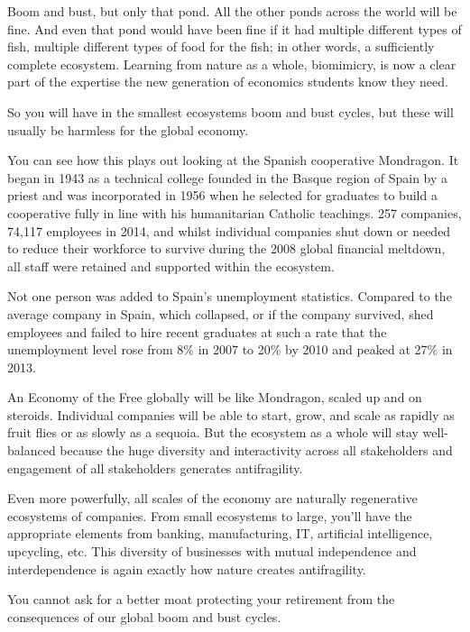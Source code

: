 Boom and bust, but only that pond. All the other ponds across the world will be fine. And even that pond would have been fine if it had multiple different types of fish, multiple different types of food for the fish; in other words, a sufficiently complete ecosystem. Learning from nature as a whole, biomimicry, is now a clear part of the expertise the new generation of economics students know they need. 


So you will have in the smallest ecosystems boom and bust cycles, but these will usually be harmless for the global economy. 


You can see how this plays out looking at the Spanish cooperative Mondragon. It began in 1943 as a technical college founded in the Basque region of Spain by a priest and was incorporated in 1956 when he selected for graduates to build a cooperative fully in line with his humanitarian Catholic teachings. 257 companies, 74,117 employees in 2014, and whilst individual companies shut down or needed to reduce their workforce to survive during the 2008 global financial meltdown, all staff were retained and supported within the ecosystem. 


Not one person was added to Spain's unemployment statistics. Compared to the average company in Spain, which collapsed, or if the company survived, shed employees and failed to hire recent graduates at such a rate that the unemployment level rose from 8\% in 2007 to 20\% by 2010 and peaked at 27\% in 2013.


An Economy of the Free globally will be like Mondragon, scaled up and on steroids. Individual companies will be able to start, grow, and scale as rapidly as fruit flies or as slowly as a sequoia. But the ecosystem as a whole will stay well-balanced because the huge diversity and interactivity across all stakeholders and engagement of all stakeholders generates antifragility. 


Even more powerfully, all scales of the economy  are naturally regenerative ecosystems  of companies. From small ecosystems to large, you'll have the appropriate elements from banking, manufacturing, IT, artificial intelligence, upcycling, etc. This diversity of businesses with mutual independence and interdependence is again exactly how nature creates antifragility.


You cannot ask for a better moat protecting your retirement from the consequences of our global boom and bust cycles.


